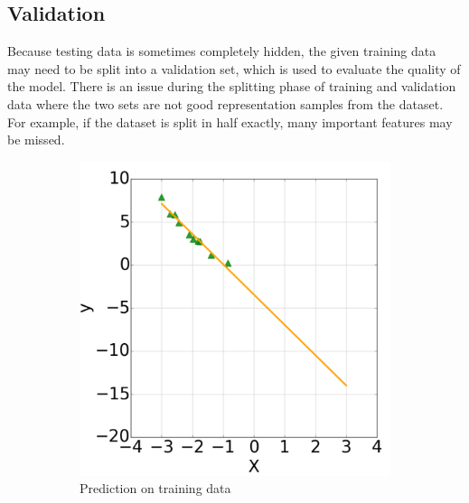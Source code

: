 \documentclass[CS5104-Notes.tex]{subfiles}
\begin{document}
\subsection{Validation}
Because testing data is sometimes completely hidden, the given training data may need to be split into a validation set, which is used to evaluate the quality of the model. There is an issue during the splitting phase of training and validation data where the two sets are not good representation samples from the dataset. For example, if the dataset is split in half exactly, many important features may be missed. 
\begin{figure}[H]
\centering
\begin{subfigure}{0.4\textwidth}
\includegraphics[width=1\textwidth]{imgs/validation-training.png}
\caption{Prediction on training data}
\end{subfigure}
~
\begin{subfigure}{0.4\textwidth}

\end{subfigure}
\end{figure}
\end{document}
